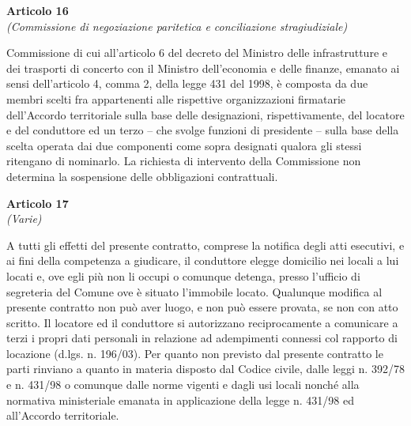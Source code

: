 \documentclass{contratto}
\begin{document}
\begin{center}
\textbf{\Large Articolo 16}\\
\textit{(Commissione di negoziazione paritetica e conciliazione stragiudiziale)}
\end{center}
Commissione di cui all’articolo 6 del decreto del Ministro delle infrastrutture e dei trasporti di
concerto con il Ministro dell’economia e delle finanze, emanato ai sensi dell’articolo 4, comma 2,
della legge 431 del 1998, è composta da due membri scelti fra appartenenti alle rispettive
organizzazioni firmatarie dell'Accordo territoriale sulla base delle designazioni, rispettivamente, del
locatore e del conduttore ed un terzo – che svolge funzioni di presidente – sulla base della scelta
operata dai due componenti come sopra designati qualora gli stessi ritengano di nominarlo. La
richiesta di intervento della Commissione non determina la sospensione delle obbligazioni
contrattuali.
\begin{center}
\textbf{\Large Articolo 17}\\
\textit{(Varie)}
\end{center}
A tutti gli effetti del presente contratto, comprese la notifica degli atti
esecutivi, e ai fini della competenza a giudicare, il conduttore elegge domicilio nei locali a lui
locati e, ove egli più non li occupi o comunque detenga, presso l'ufficio di segreteria del
Comune ove è situato l'immobile locato. Qualunque modifica al presente contratto non può
aver luogo, e non può essere provata, se non con atto scritto. Il locatore ed il conduttore si
autorizzano reciprocamente a comunicare a terzi i propri dati personali in relazione ad
adempimenti connessi col rapporto di locazione (d.lgs. n. 196/03). Per quanto non previsto
dal presente contratto le parti rinviano a quanto in materia disposto dal Codice civile, dalle
leggi n. 392/78 e n. 431/98 o comunque dalle norme vigenti e dagli usi locali nonché alla
normativa ministeriale emanata in applicazione della legge n. 431/98 ed all'Accordo
territoriale. \\
\end{document}
